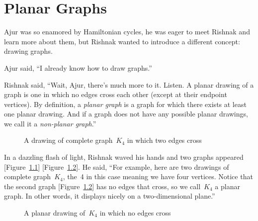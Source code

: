 \chapter{Planar Graphs}
Ajur was so enamored by Hamiltonian cycles, he was eager to meet Rishnak and learn more about them, but Rishnak wanted to introduce a different concept: drawing graphs.

Ajur said, ``I already know how to draw graphs.''

Rishnak said, ``Wait, Ajur, there's much more to it. Listen. A planar drawing of a graph is one in which no edges cross each other (except at their endpoint vertices). By definition, a \textit{planar graph} is a graph for which there exists at least one planar drawing. And if a graph does not have any possible planar drawings, we call it a \textit{non-planar graph}.''

\begin{figure}
\begin{center}
\caption{A drawing of complete graph~$K_4$ in which two edges cross}\label{9g1}
\end{center}
\end{figure}

In a dazzling flash of light, Rishnak waved his hands and two graphs appeared [Figure~\ref{9g1}] [Figure~\ref{9g2}]. He said, ``For example, here are two drawings of complete graph~$K_4$, the~4 in this case meaning we have four vertices. Notice that the second graph [Figure~\ref{9g2}] has no edges that cross, so we call~$K_4$ a planar graph. In other words, it displays nicely on a two-dimensional plane.''

\begin{figure}
\begin{center}
\caption{A planar drawing of~$K_4$ in which no edges cross}\label{9g2}
\end{center}
\end{figure}

